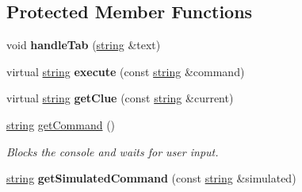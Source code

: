 \subsection*{\-Protected \-Member \-Functions}
\begin{DoxyCompactItemize}
\item 
\hypertarget{classmbdev_1_1console__application_a8dc3fef0a026cb33b71b08ae3a02c9fd}{void {\bfseries handle\-Tab} (\hyperlink{classmbdev_1_1string}{string} \&text)}\label{classmbdev_1_1console__application_a8dc3fef0a026cb33b71b08ae3a02c9fd}

\item 
\hypertarget{classmbdev_1_1console__application_ac6bd452145f850e141c3ca64f401c04c}{virtual \hyperlink{classmbdev_1_1string}{string} {\bfseries execute} (const \hyperlink{classmbdev_1_1string}{string} \&command)}\label{classmbdev_1_1console__application_ac6bd452145f850e141c3ca64f401c04c}

\item 
\hypertarget{classmbdev_1_1console__application_a518e890cc969a5986d171dea2e800115}{virtual \hyperlink{classmbdev_1_1string}{string} {\bfseries get\-Clue} (const \hyperlink{classmbdev_1_1string}{string} \&current)}\label{classmbdev_1_1console__application_a518e890cc969a5986d171dea2e800115}

\item 
\hyperlink{classmbdev_1_1string}{string} \hyperlink{classmbdev_1_1console__application_a7d13549416b40695a144fd1f3eb999bc}{get\-Command} ()
\begin{DoxyCompactList}\small\item\em \-Blocks the console and waits for user input. \end{DoxyCompactList}\item 
\hypertarget{classmbdev_1_1console__application_a045e4f99a41e470c5e2f85cfce5d65a8}{\hyperlink{classmbdev_1_1string}{string} {\bfseries get\-Simulated\-Command} (const \hyperlink{classmbdev_1_1string}{string} \&simulated)}\label{classmbdev_1_1console__application_a045e4f99a41e470c5e2f85cfce5d65a8}

\end{DoxyCompactItemize}
